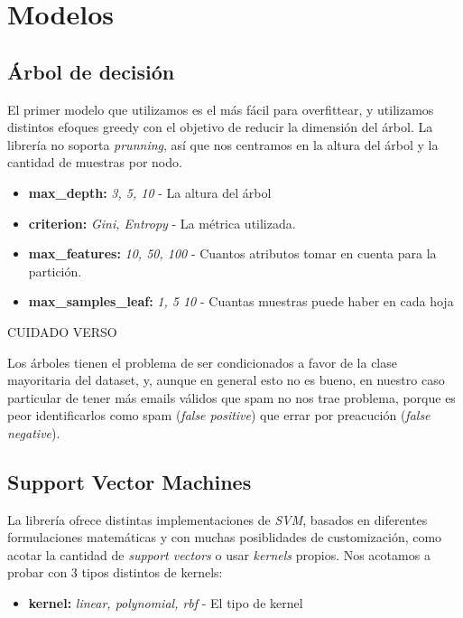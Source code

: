 \section{Modelos}
\subsection{Árbol de decisión}
El primer modelo que utilizamos es el más fácil para overfittear, y utilizamos distintos efoques greedy con el objetivo de reducir la dimensión del árbol.
La librería no soporta \textit{prunning}, así que nos centramos en la altura del árbol y la cantidad de muestras por nodo.
\begin{itemize}
\item \textbf{max\_depth:} \textit{3, 5, 10} - La altura del árbol
\item \textbf{criterion:} \textit{Gini, Entropy} - La métrica utilizada.
\item \textbf{max\_features:} \textit{10, 50, 100} - Cuantos atributos tomar en cuenta para la partición.
\item \textbf{max\_samples\_leaf:} \textit{1, 5 10} - Cuantas muestras puede haber en cada hoja
\end{itemize}
{\Large CUIDADO VERSO}

Los árboles tienen el problema de ser condicionados a favor de la clase mayoritaria del dataset, y, aunque en general esto no es bueno,
en nuestro caso particular de tener más emails válidos que spam no nos trae problema, porque es peor identificarlos como spam (\textit{false positive}) que errar por preacución (\textit{false negative}).

\subsection{Support Vector Machines}
La librería ofrece distintas implementaciones de \textit{SVM}, basados en diferentes formulaciones matemáticas y con muchas posiblidades de customización,
como acotar la cantidad de \textit{support vectors} o usar \textit{kernels} propios. Nos acotamos a probar con 3 tipos distintos de kernels:
\begin{itemize}
\item \textbf{kernel:} \textit{linear, polynomial, rbf} - El tipo de kernel
\end{itemize}

